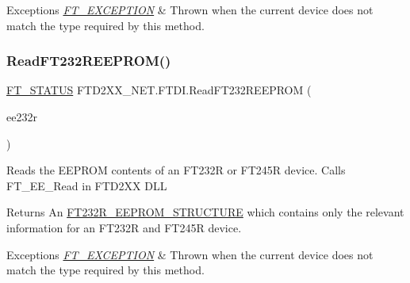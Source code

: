 \begin{DoxyExceptions}{Exceptions}
{\em \mbox{\hyperlink{class_f_t_d2_x_x___n_e_t_1_1_f_t_d_i_1_1_f_t___e_x_c_e_p_t_i_o_n}{F\+T\+\_\+\+E\+X\+C\+E\+P\+T\+I\+ON}}} & Thrown when the current device does not match the type required by this method.\\
\hline
\end{DoxyExceptions}
\mbox{\label{class_f_t_d2_x_x___n_e_t_1_1_f_t_d_i_a14db2a1cce4a2242837b9c5d6a8cefa8}} 
\subsubsection{\texorpdfstring{ReadFT232REEPROM()}{ReadFT232REEPROM()}}
{\footnotesize\ttfamily \mbox{\hyperlink{class_f_t_d2_x_x___n_e_t_1_1_f_t_d_i_aabe20ad905cc4ccc1e35dd5b877d9a83}{F\+T\+\_\+\+S\+T\+A\+T\+US}} F\+T\+D2\+X\+X\+\_\+\+N\+E\+T.\+F\+T\+D\+I.\+Read\+F\+T232\+R\+E\+E\+P\+R\+OM (\begin{DoxyParamCaption}\item[{\mbox{\hyperlink{class_f_t_d2_x_x___n_e_t_1_1_f_t_d_i_1_1_f_t232_r___e_e_p_r_o_m___s_t_r_u_c_t_u_r_e}{F\+T232\+R\+\_\+\+E\+E\+P\+R\+O\+M\+\_\+\+S\+T\+R\+U\+C\+T\+U\+RE}}}]{ee232r }\end{DoxyParamCaption})}



Reads the E\+E\+P\+R\+OM contents of an F\+T232R or F\+T245R device. Calls F\+T\+\_\+\+E\+E\+\_\+\+Read in F\+T\+D2\+XX D\+LL 

\begin{DoxyReturn}{Returns}
An \mbox{\hyperlink{class_f_t_d2_x_x___n_e_t_1_1_f_t_d_i_1_1_f_t232_r___e_e_p_r_o_m___s_t_r_u_c_t_u_r_e}{F\+T232\+R\+\_\+\+E\+E\+P\+R\+O\+M\+\_\+\+S\+T\+R\+U\+C\+T\+U\+RE}} which contains only the relevant information for an F\+T232R and F\+T245R device.
\end{DoxyReturn}

\begin{DoxyExceptions}{Exceptions}
{\em \mbox{\hyperlink{class_f_t_d2_x_x___n_e_t_1_1_f_t_d_i_1_1_f_t___e_x_c_e_p_t_i_o_n}{F\+T\+\_\+\+E\+X\+C\+E\+P\+T\+I\+ON}}} & Thrown when the current device does not match the type required by this method.\\
\hline
\end{DoxyExceptions}
\mbox{\label{class_f_t_d2_x_x___n_e_t_1_1_f_t_d_i_a0518fd358de256eeb84fc9a8f9280e76}} 
